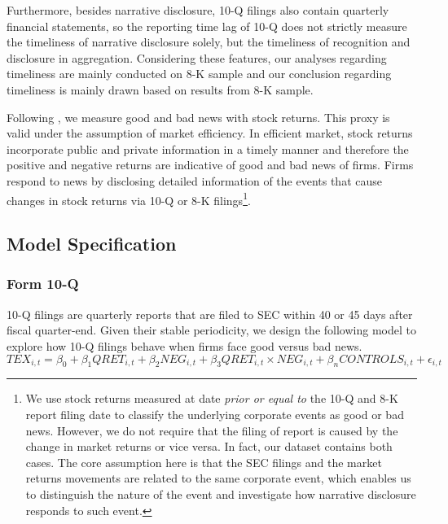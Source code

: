 \documentclass[a4paper]{article}
\begin{document}
\begin{spacing}{2}
Furthermore, besides narrative disclosure, 10-Q filings also contain quarterly financial statements, so the reporting time lag of 10-Q does not strictly measure the timeliness of narrative disclosure solely, but the timeliness of recognition and disclosure in aggregation. Considering these features, our analyses regarding timeliness are mainly conducted on 8-K sample and our conclusion regarding timeliness is mainly drawn based on results from 8-K sample.

Following \citet{basuConservatismPrincipleAsymmetric1997}, we measure good and bad news with stock returns. This proxy is valid under the assumption of market efficiency. In efficient market, stock returns incorporate public and private information in a timely manner and therefore the positive and negative returns are indicative of good and bad news of firms. %
Firms respond to news by disclosing detailed information of the events that cause changes in stock returns via 10-Q or 8-K filings\footnote{We use stock returns measured at date \textit{prior or equal to} the 10-Q and 8-K report filing date to classify the underlying corporate events as good or bad news. 
However, we do not require that the filing of report is caused by the change in market returns or vice versa. In fact, our dataset contains both cases. The core assumption here is that the SEC filings and the market returns movements are related to the same corporate event, which enables us to distinguish the nature of the event and investigate how narrative disclosure responds to such event.}.

\subsection{Model Specification}
\subsubsection{Form 10-Q}
10-Q filings are quarterly reports that are filed to SEC within 40 or 45 days after fiscal quarter-end. Given their stable periodicity, we design the following model to explore how 10-Q filings behave when firms face good versus bad news. 
\begin{equation} \label{eq1}
TEX_{i,t}=\beta_0+\beta_1QRET_{i,t}+\beta_2NEG_{i,t}+\beta_3QRET_{i,t}\times NEG_{i,t}+\beta_nCONTROLS_{i,t}+\epsilon_{i,t}
\end{equation}


\end{spacing}
\end{document}

